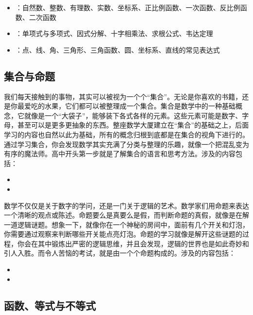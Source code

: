 \begin{itemize}
\item {}：自然数、整数、有理数、实数、坐标系、正比例函数、一次函数、反比例函数、二次函数
\item {}：单项式与多项式、因式分解、十字相乘法、求根公式、韦达定理
\item {}：点、线、角、三角形、三角函数、圆、坐标系、直线的常见表达式
\end{itemize}


\subsection{集合与命题}

我们每天接触到的事物，其实可以被视为一个个“集合”。无论是你喜欢的书籍，还是你最爱吃的水果，它们都可以被整理成一个集合。集合是数学中的一种基础概念，它就像是一个“大袋子”，能够装下各式各样的元素。这些元素可能是数字、字母，甚至可以是更多更抽象的东西。整座数学大厦建立在“集合”的基础之上，后面学习的内容也自然以此为基础，所有的概念归根到底都是在集合的视角下进行的。通过学习集合，你会发现数学其实充满了分类与整理的乐趣，就像一个把混乱变为有序的魔法师。高中开头第一步就是了解集合的语言和思考方法。涉及的内容包括：

\begin{itemize}
\item {}
\item {}
\end{itemize}

数学不仅仅是关于数字的学问，还是一门关于逻辑的艺术。数学家们用命题来表达一个清晰的观点或陈述。命题要么是真要么是假，而判断命题的真假，就像是在解一道逻辑谜题。想象一下，就像你在一个神秘的房间中，面前有几个开关和灯泡，你需要通过观察来判断哪些开关能点亮灯泡。命题的学习就像是解开这些谜题的过程，你会在其中锻炼出严密的逻辑思维，并且会发现，逻辑的世界也是如此奇妙和引人入胜。而令人苦恼的考试，就是由一个个命题构成的。涉及的内容包括：
\begin{itemize}
\item {}
\item {}
\end{itemize}

\subsection{函数、等式与不等式}

